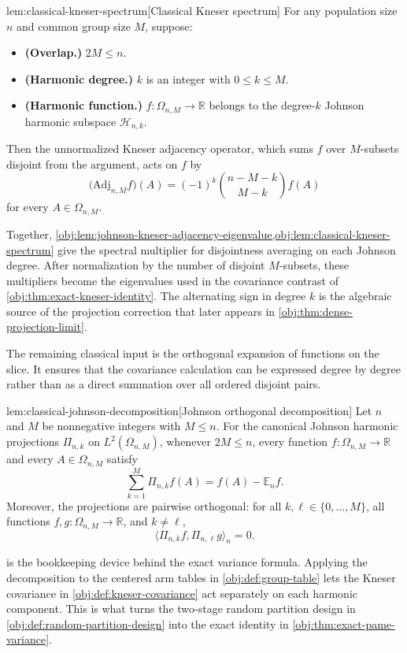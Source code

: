 \begin{lemmav}{lem:classical-kneser-spectrum}[Classical Kneser spectrum]
For any population size \(n\) and common group size \(M\), suppose:
\begin{itemize}
\item \textbf{(Overlap.)} \(2M\le n\).
\item \textbf{(Harmonic degree.)} \(k\) is an integer with \(0\le k\le M\).
\item \textbf{(Harmonic function.)} \(f:\Omega_{n,M}\to\mathbb R\) belongs to the degree-\(k\) Johnson harmonic subspace \(\mathcal H_{n,k}\).
\end{itemize}
Then the unnormalized Kneser adjacency operator, which sums \(f\) over \(M\)-subsets disjoint from the argument, acts on \(f\) by
\[
\bigl(\mathrm{Adj}_{n,M} f\bigr)(A)
=
(-1)^k \binom{n-M-k}{M-k} f(A)
\]
for every \(A\in\Omega_{n,M}\).
\end{lemmav}

Together, \cref{obj:lem:johnson-kneser-adjacency-eigenvalue,obj:lem:classical-kneser-spectrum} give the spectral multiplier for disjointness averaging on each Johnson degree. After normalization by the number of disjoint \(M\)-subsets, these multipliers become the eigenvalues used in the covariance contrast of \cref{obj:thm:exact-kneser-identity}. The alternating sign in degree \(k\) is the algebraic source of the projection correction that later appears in \cref{obj:thm:dense-projection-limit}.

The remaining classical input is the orthogonal expansion of functions on the slice. It ensures that the covariance calculation can be expressed degree by degree rather than as a direct summation over all ordered disjoint pairs.

\begin{lemmav}{lem:classical-johnson-decomposition}[Johnson orthogonal decomposition]
Let \(n\) and \(M\) be nonnegative integers with \(M\le n\). For the canonical Johnson harmonic projections \(\Pi_{n,k}\) on \(L^2(\Omega_{n,M})\), whenever \(2M\le n\), every function \(f:\Omega_{n,M}\to\mathbb R\) and every \(A\in\Omega_{n,M}\) satisfy
\[
\sum_{k=1}^{M}\Pi_{n,k}f(A)
=
f(A)-\mathbb E_n f .
\]
Moreover, the projections are pairwise orthogonal: for all \(k,\ell\in\{0,\ldots,M\}\), all functions \(f,g:\Omega_{n,M}\to\mathbb R\), and \(k\ne \ell\),
\[
\langle \Pi_{n,k}f,\Pi_{n,\ell}g\rangle_n=0 .
\]
\end{lemmav}

 is the bookkeeping device behind the exact variance formula. Applying the decomposition to the centered arm tables in \cref{obj:def:group-table} lets the Kneser covariance in \cref{obj:def:kneser-covariance} act separately on each harmonic component. This is what turns the two-stage random partition design in \cref{obj:def:random-partition-design} into the exact identity in \cref{obj:thm:exact-pame-variance}.

